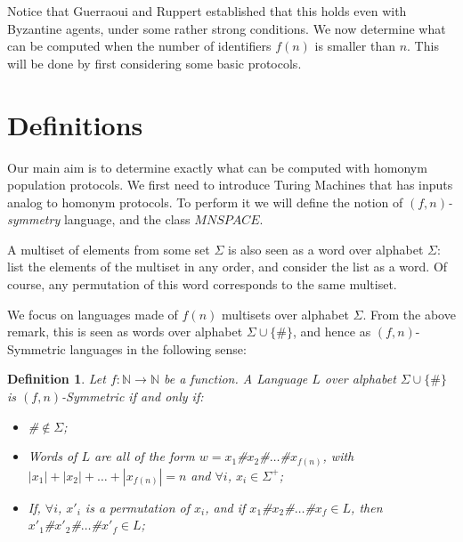 \documentclass[UKenglish]{llncs}
\newtheorem{define}{Definition}
\newcommand\motnouv[1]{{\emph{#1}}}
\begin{document}
Notice that Guerraoui and Ruppert \cite{guerraoui2009names}
established that this holds even with Byzantine agents, under some
rather strong conditions.  We now determine what can be computed when
the number of identifiers $f(n)$ is smaller than $n$. This will be
done by first considering some basic protocols.




\section{Definitions}
\label{sec:3}







































Our  main aim  is to determine exactly what can be computed
with homonym population protocols. We first need to introduce
Turing Machines that has inputs analog to homonym protocols. To perform it
we  will define the notion of \emph{$(f,n)$-symmetry} language,
and   the  class $MNSPACE$.




A multiset of elements from some set $\Sigma$ is also  seen as a
word over alphabet $\Sigma$: list the elements of the multiset in any
order, and consider the list as a word. Of course, any permutation of
this word corresponds to the same multiset. 

We focus on languages made of $f(n)$ multisets over alphabet
$\Sigma$. From the above remark, this is seen as words over alphabet
$\Sigma\cup\{\#\}$, and hence as $(f,n)$-Symmetric languages in the
following sense: 


\begin{define}\label{defmnspace}
 Let $f:\mathbb{N}\to\mathbb{N}$ be a function. 
A Language $L$ over alphabet $\Sigma\cup\{\#\}$ is  \motnouv{$(f,n)$-Symmetric} if  and only if:
\begin{itemize}
\item \#$\not\in\Sigma$;
\item Words of $L$ are all of the form $w=x_1$\#$x_2$\#$\ldots$\#$x_{f(n)}$, with $|x_1|+|x_2|+\ldots+|x_{f(n)}|=n$ and
$\forall i$, $x_i\in\Sigma^+$;
\item If, $\forall i$, $x'_i$ is a permutation of $x_i$, and if $x_1$\#$x_2$\#$\ldots$\#$x_{f}\in L$, 
then \\ $x'_1$\#$x'_2$\#$\ldots$\#$x'_{f}\in L$;

\end{itemize}
\end{define}
\end{document}
